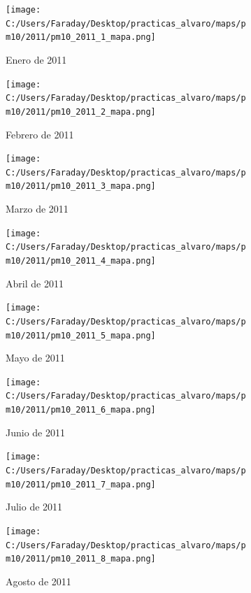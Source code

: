 \documentclass[12pt]{article}
\begin{document}
\newpage

\begin{figure}[H]
\centering
\begin{subfigure}[h]{0.45\textwidth}
\texttt{[image: C:/Users/Faraday/Desktop/practicas\_alvaro/maps/pm10/2011/pm10\_2011\_1\_mapa.png]}
\caption{Enero de 2011}
\label{fig:map-mon-3-1-2011}
\end{subfigure}
%
\begin{subfigure}[H]{0.45\textwidth}
\texttt{[image: C:/Users/Faraday/Desktop/practicas\_alvaro/maps/pm10/2011/pm10\_2011\_2\_mapa.png]}
\caption{Febrero de 2011}
\label{fig:map-mon-3-2-2011}
\end{subfigure}
\caption{}
\end{figure}

\begin{figure}[H]
\centering
\begin{subfigure}[h]{0.45\textwidth}
\texttt{[image: C:/Users/Faraday/Desktop/practicas\_alvaro/maps/pm10/2011/pm10\_2011\_3\_mapa.png]}
\caption{Marzo de 2011}
\label{fig:map-mon-3-3-2011}
\end{subfigure}
%
\begin{subfigure}[H]{0.45\textwidth}
\texttt{[image: C:/Users/Faraday/Desktop/practicas\_alvaro/maps/pm10/2011/pm10\_2011\_4\_mapa.png]}
\caption{Abril de 2011}
\label{fig:map-mon-3-4-2011}
\end{subfigure}
\caption{}
\end{figure}

\begin{figure}[H]
\centering
\begin{subfigure}[h]{0.45\textwidth}
\texttt{[image: C:/Users/Faraday/Desktop/practicas\_alvaro/maps/pm10/2011/pm10\_2011\_5\_mapa.png]}
\caption{Mayo de 2011}
\label{fig:map-mon-3-5-2011}
\end{subfigure}
%
\begin{subfigure}[H]{0.45\textwidth}
\texttt{[image: C:/Users/Faraday/Desktop/practicas\_alvaro/maps/pm10/2011/pm10\_2011\_6\_mapa.png]}
\caption{Junio de 2011}
\label{fig:map-mon-3-6-2011}
\end{subfigure}
\caption{}
\end{figure}

\newpage

\begin{figure}[H]
\centering
\begin{subfigure}[h]{0.45\textwidth}
\texttt{[image: C:/Users/Faraday/Desktop/practicas\_alvaro/maps/pm10/2011/pm10\_2011\_7\_mapa.png]}
\caption{Julio de 2011}
\label{fig:map-mon-3-7-2011}
\end{subfigure}
%
\begin{subfigure}[H]{0.45\textwidth}
\texttt{[image: C:/Users/Faraday/Desktop/practicas\_alvaro/maps/pm10/2011/pm10\_2011\_8\_mapa.png]}
\caption{Agosto de 2011}
\label{fig:map-mon-3-8-2011}
\end{subfigure}
\caption{}
\end{figure}
\end{document}
